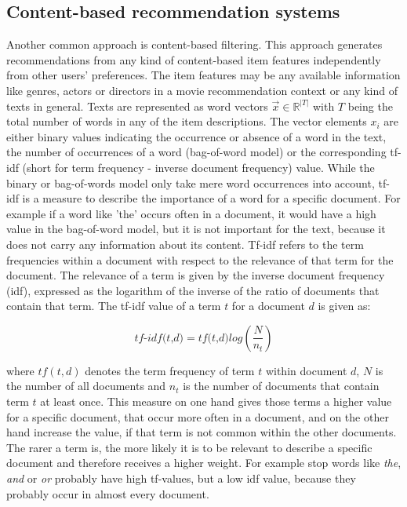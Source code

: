 \documentclass[10pt]{reportMaster}
\begin{document}


\subsection*{Content-based recommendation systems}
\label{rs_cb}

Another common approach is content-based filtering.
This approach generates recommendations from any kind of content-based item features independently from other users' preferences.
The item features may be any available information like genres, actors or directors in a movie recommendation context or any kind of texts in general.
Texts are represented as word vectors $\vec{x} \in \mathds{R}^{|T|}$ with $T$ being the total number of words in any of the item descriptions.
The vector elements $x_i$ are either binary values indicating the occurrence or absence of a word in the text, the number of occurrences of a word (bag-of-word model) or the corresponding tf-idf (short for term frequency - inverse document frequency) value.
While the binary or bag-of-words model only take mere word occurrences into account, tf-idf is a measure to describe the importance of a word for a specific document.
For example if a word like 'the' occurs often in a document, it would have a high value in the bag-of-word model, but it is not important for the text, because it does not carry any information about its content.
Tf-idf refers to the term frequencies within a document with respect to the relevance of that term for the document.
The relevance of a term is given by the inverse document frequency (idf), expressed as the logarithm of the inverse of the ratio of documents that contain that term.
The tf-idf value of a term $t$ for a document $d$ is given as:

$$
	\textit{tf-idf(t,d)} = \textit{tf(t,d)} log(\frac{N}{n_t})
$$

where $tf(t,d)$ denotes the term frequency of term $t$ within document $d$, $N$ is the number of all documents and $n_t$ is the number of documents that contain term $t$ at least once. 
This measure on one hand gives those terms a higher value for a specific document, that occur more often in a document, and on the other hand increase the value, if that term is not common within the other documents.
The rarer a term is, the more likely it is to be relevant to describe a specific document and therefore receives a higher weight.
For example stop words like \textit{the}, \textit{and} or \textit{or} probably have high tf-values, but a low idf value, because they probably occur in almost every document.
\end{document}
